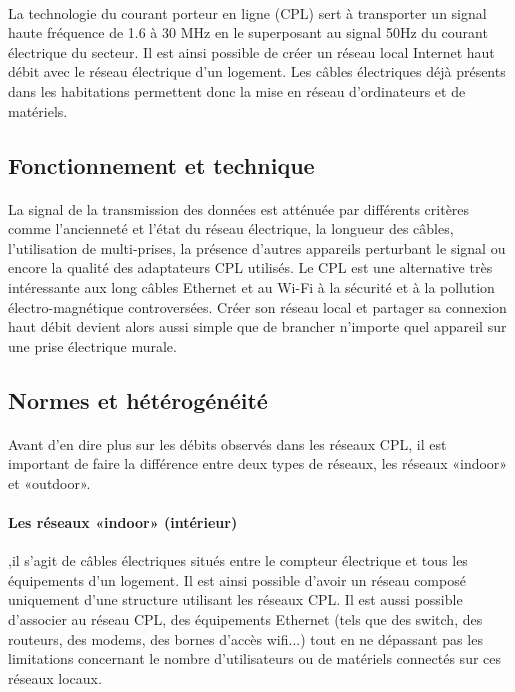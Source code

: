             \paragraph{}
La technologie du courant porteur en ligne (CPL) sert à transporter un signal haute fréquence de 1.6 à 30 MHz en le superposant au signal 50Hz du courant électrique du secteur.
Il est ainsi possible de créer un réseau local Internet haut débit avec le réseau électrique d'un logement.
Les câbles électriques déjà présents dans les habitations permettent donc la mise en réseau d'ordinateurs et de matériels.

        \subsection{Fonctionnement et technique}
            \paragraph{}
La signal de la transmission des données est atténuée par différents critères comme l’ancienneté et l'état du réseau électrique, la longueur des câbles, l'utilisation de multi-prises, la présence d'autres appareils perturbant le signal ou encore la qualité des adaptateurs CPL utilisés.
Le CPL est une alternative très intéressante aux long câbles Ethernet et au Wi-Fi à la sécurité et à la pollution électro-magnétique controversées.
Créer son réseau local et partager sa connexion haut débit devient alors aussi simple que de brancher n'importe quel appareil sur une prise électrique murale.

        \subsection{Normes et hétérogénéité}
            \paragraph{}
Avant d’en dire plus sur les débits observés dans les réseaux CPL, il est important de faire la différence entre deux types de réseaux,
les réseaux «indoor» et «outdoor».
            \paragraph{Les réseaux «indoor» (intérieur)}
,il s'agit de câbles électriques situés entre le compteur électrique et tous les équipements d’un logement.
Il est ainsi possible d'avoir un réseau composé uniquement d'une structure utilisant les réseaux CPL.
Il est aussi possible d'associer au réseau CPL, des équipements Ethernet (tels que des switch, des routeurs, des modems, des bornes d'accès wifi...)
tout en ne dépassant pas les limitations concernant le nombre d'utilisateurs ou de matériels connectés sur ces réseaux locaux.
